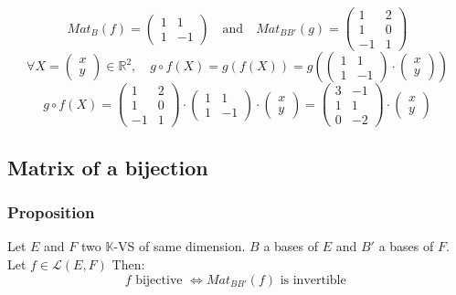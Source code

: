 \documentclass[notitlepage]{math}
\begin{document}
\[ Mat_B(f)= \begin{pmatrix}
        1 & 1 \\
        1 & -1
    \end{pmatrix} \quad \text{and} \quad Mat_{BB'}(g)=\begin{pmatrix}
        1 & 2  \\
        1 & 0  \\
        -1 & 1
    \end{pmatrix}\]
    \[ \forall X = \begin{pmatrix} x \\ y \end{pmatrix} \in \mathbb{R}^2, \quad g \circ f(X) = g(f(X)) = g \left(\begin{pmatrix}
        1 & 1 \\
        1 & -1
    \end{pmatrix} \cdot \begin{pmatrix}
        x \\
        y
    \end{pmatrix} \right)\]
    \[ g \circ f(X) =
        \begin{pmatrix}
        1 & 2  \\
        1 & 0  \\
        -1 & 1
    \end{pmatrix} \cdot \begin{pmatrix}
        1 & 1 \\
        1 & -1
    \end{pmatrix} \cdot \begin{pmatrix}
        x \\
        y
    \end{pmatrix} = \begin{pmatrix}
        3 & -1 \\
        1 & 1 \\
        0 & -2 
    \end{pmatrix} \cdot \begin{pmatrix}
        x \\
        y
    \end{pmatrix} \]

\subsection{Matrix of a bijection}
\subsubsection{Proposition}
Let $E$ and $F$ two $\mathbb{K}$-VS of same dimension. $B$ a bases of $E$ and $B'$ a bases of $F$. Let $f \in \mathcal{L}(E,F)$ Then:
\[ f \text{ bijective } \Longleftrightarrow Mat_{BB'}(f) \text{ is invertible }\]
\end{document}
